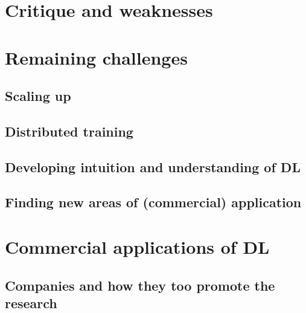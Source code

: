 \documentclass[]{article}
\begin{document}
\section{Critique and weaknesses}
\section{Remaining challenges}
	\subsection{Scaling up}
	\subsection{Distributed training}
	\subsection{Developing intuition and understanding of DL}
	\subsection{Finding new areas of (commercial) application}
\section{Commercial applications of DL}
	\subsection{Companies and how they too promote the research}
	
	
	
	
\end{document}
